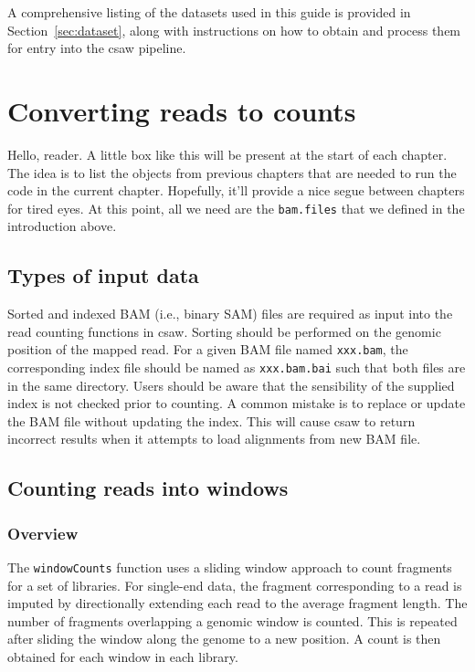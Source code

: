 \documentclass[12pt]{report}
\newcommand{\pkgname}{csaw}
\newcommand{\code}[1]{{\small\texttt{#1}}}
\newenvironment{combox}
{ \begin{shaded}\begin{center}\begin{minipage}[t]{0.95\textwidth} }
{ \end{minipage}\end{center}\end{shaded} }
\begin{document}
A comprehensive listing of the datasets used in this guide is provided in Section~\ref{sec:dataset}, along with instructions on how to obtain and process them for entry into the \pkgname{} pipeline.


\chapter{Converting reads to counts}
\label{chap:count}
\begin{combox}
Hello, reader.
A little box like this will be present at the start of each chapter.
The idea is to list the objects from previous chapters that are needed to run the code in the current chapter.
Hopefully, it'll provide a nice segue between chapters for tired eyes.
At this point, all we need are the \code{bam.files} that we defined in the introduction above.
\end{combox}

\section{Types of input data}
Sorted and indexed BAM (i.e., binary SAM) files are required as input into the read counting functions in \pkgname{}. 
Sorting should be performed on the genomic position of the mapped read.
For a given BAM file named \code{xxx.bam}, the corresponding index file should be named as \code{xxx.bam.bai} such that both files are in the same directory. 
Users should be aware that the sensibility of the supplied index is not checked prior to counting. 
A common mistake is to replace or update the BAM file without updating the index. 
This will cause \pkgname{} to return incorrect results when it attempts to load alignments from new BAM file.

\section{Counting reads into windows}

\subsection{Overview}
The \code{windowCounts} function uses a sliding window approach to count fragments for a set of libraries. 
For single-end data, the fragment corresponding to a read is imputed by directionally extending each read to the average fragment length. 
The number of fragments overlapping a genomic window is counted. 
This is repeated after sliding the window along the genome to a new position. 
A count is then obtained for each window in each library. 
\end{document}
